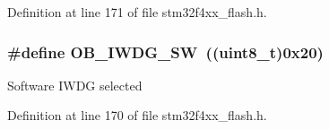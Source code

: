 Definition at line 171 of file stm32f4xx\-\_\-flash.\-h.

\hypertarget{group___f_l_a_s_h___option___bytes___i_watchdog_ga5a357e232c955444c3f2ccb9a937ffce}{
\subsubsection[{O\-B\-\_\-\-I\-W\-D\-G\-\_\-\-S\-W}]{\setlength{\rightskip}{0pt plus 5cm}\#define O\-B\-\_\-\-I\-W\-D\-G\-\_\-\-S\-W~((uint8\-\_\-t)0x20)}}\label{group___f_l_a_s_h___option___bytes___i_watchdog_ga5a357e232c955444c3f2ccb9a937ffce}
Software I\-W\-D\-G selected 

Definition at line 170 of file stm32f4xx\-\_\-flash.\-h.

